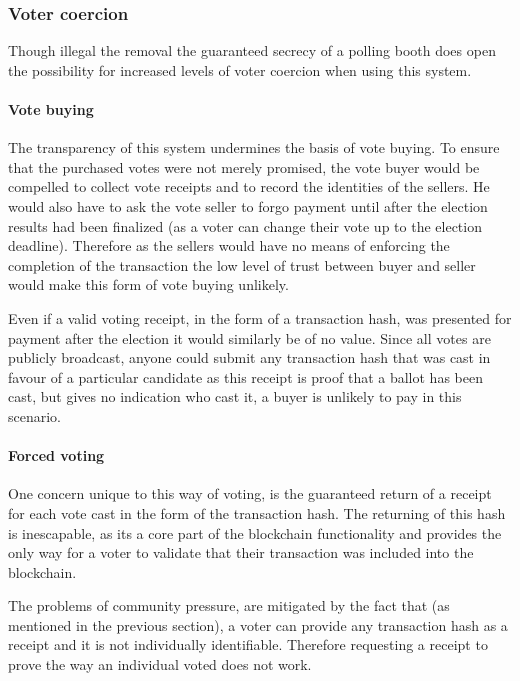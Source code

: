 \documentclass{article}
\begin{document}
    \subsubsection{Voter coercion}
    Though illegal the removal the guaranteed secrecy of a polling booth does open the possibility for increased levels of voter coercion when using this system.    
    
	\paragraph{Vote buying}
	\hfill \break \break
	The transparency of this system undermines the basis of vote buying. To ensure that the purchased votes were not merely promised, the vote buyer would be compelled to collect vote receipts and to record the identities of the sellers. He would also have to ask the vote seller to forgo payment until after the election results had been finalized (as a voter can change their vote up to the election deadline). Therefore as the sellers would have no means of enforcing the completion of the transaction the low level of trust between buyer and seller would make this form of vote buying unlikely.

	Even if a valid voting receipt, in the form of a transaction hash, was presented for payment after the election it would similarly be of no value. Since all votes are publicly broadcast, anyone could submit any transaction hash that was cast in favour of a particular candidate as this receipt is proof that a ballot has been cast, but gives no indication who cast it, a buyer is unlikely to pay in this scenario.

	\clearpage
	\paragraph{Forced voting}
	\hfill \break \break
	One concern unique to this way of voting, is the guaranteed return of a receipt for each vote cast in the form of the transaction hash. The returning of this hash is inescapable, as its a core part of the blockchain functionality and provides the only way for a voter to validate that their transaction was included into the blockchain. 
	
	The problems of community pressure, are mitigated by the fact that (as mentioned in the previous section), a voter can provide any transaction hash as a receipt and it is not individually identifiable. Therefore requesting a receipt to prove the way an individual voted does not work.
	
\end{document}
